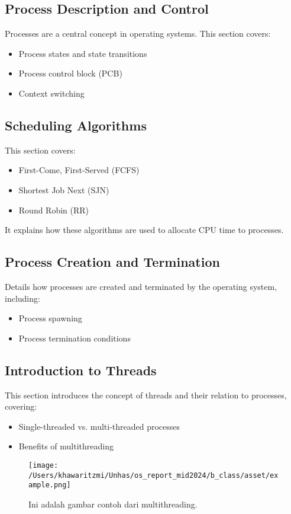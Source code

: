 \documentclass[12pt]{article}
\begin{document}
\subsection{Process Description and Control}
Processes are a central concept in operating systems. This section covers:
\begin{itemize}
    \item Process states and state transitions
    \item Process control block (PCB)
    \item Context switching
\end{itemize}

\subsection{Scheduling Algorithms}
This section covers:
\begin{itemize}
    \item First-Come, First-Served (FCFS)
    \item Shortest Job Next (SJN)
    \item Round Robin (RR)
\end{itemize}
It explains how these algorithms are used to allocate CPU time to processes.

\subsection{Process Creation and Termination}
Details how processes are created and terminated by the operating system, including:
\begin{itemize}
    \item Process spawning
    \item Process termination conditions
\end{itemize}

\subsection{Introduction to Threads}
This section introduces the concept of threads and their relation to processes, covering:
\begin{itemize}
    \item Single-threaded vs. multi-threaded processes
    \item Benefits of multithreading
\end{itemize}

\begin{figure}[h]
    \centering
    \texttt{[image: /Users/khawaritzmi/Unhas/os\_report\_mid2024/b\_class/asset/example.png]}  %
    \caption{Ini adalah gambar contoh dari multithreading.}
    \label{fig:contoh_gambar}
\end{figure}
\end{document}

